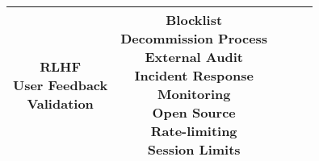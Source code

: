 \documentclass[fleqn]{article}
\begin{document}
\begin{landscape}
\begin{table}[H]
\begin{tabular}{|c|c|c|c|c|}
{			\textbullet\hspace{3pt} RLHF\\ 
			\textbullet\hspace{3pt} User Feedback\\ 
			\textbullet\hspace{3pt} Validation\\ 							 	 
		}
		& \makecell[l]{
			\textbullet\hspace{3pt} Blocklist \\ 	
			\textbullet\hspace{3pt} Decommission Process\\ 	
			\textbullet\hspace{3pt} External Audit\\ 
			\textbullet\hspace{3pt} Incident Response\\  
			\textbullet\hspace{3pt} Monitoring\\ 	
			\textbullet\hspace{3pt} Open Source\\
			\textbullet\hspace{3pt} Rate-limiting \\ 
			\textbullet\hspace{3pt} Session Limits\\ 				 	 
		} \\
		\hline
	\end{tabular}
	\label{table:med_risk_plan_by_gai_risk_cont}
\end{table}

\vfill
\raisebox{-10pt}{\makebox[\linewidth]{\thepage}}

\pagebreak
\thispagestyle{empty}


\end{landscape}
\end{document}
